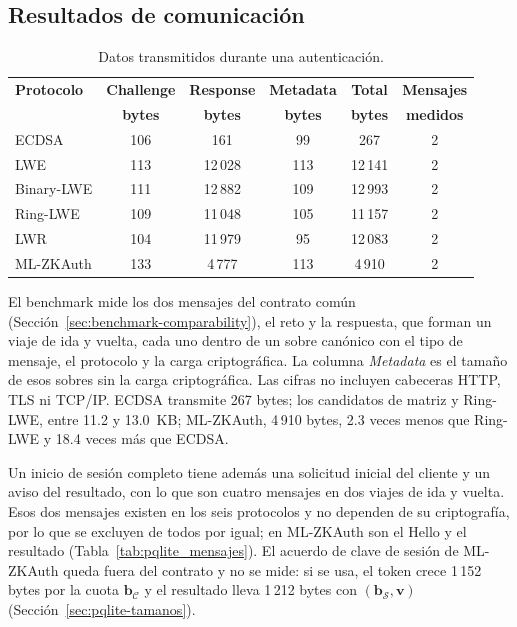\subsection{Resultados de comunicación}
\label{sec:communication-results}

\begin{table}[H]
\centering
\caption{Datos transmitidos durante una autenticación.}
\label{tab:communication}
\small
\begin{tabularx}{\textwidth}{lCCCCC}
\toprule
\textbf{Protocolo} &
\textbf{Challenge} &
\textbf{Response} &
\textbf{Metadata} &
\textbf{Total} &
\textbf{Mensajes} \\
&
\textbf{bytes} &
\textbf{bytes} &
\textbf{bytes} &
\textbf{bytes} &
\textbf{medidos} \\
\midrule

ECDSA      & 106 & 161 & 99 & 267 & 2 \\
LWE        & 113 & 12\,028 & 113 & 12\,141 & 2 \\
Binary-LWE & 111 & 12\,882 & 109 & 12\,993 & 2 \\
Ring-LWE   & 109 & 11\,048 & 105 & 11\,157 & 2 \\
LWR        & 104 & 11\,979 & 95 & 12\,083 & 2 \\
ML-ZKAuth  & 133 & 4\,777 & 113 & 4\,910 & 2 \\

\bottomrule
\end{tabularx}
\end{table}

El benchmark mide los dos mensajes del contrato común (Sección~\ref{sec:benchmark-comparability}), el reto y la respuesta, que forman un viaje de ida y vuelta, cada uno dentro de un sobre canónico con el tipo de mensaje, el protocolo y la carga criptográfica. La columna \textit{Metadata} es el tamaño de esos sobres sin la carga criptográfica. Las cifras no incluyen cabeceras HTTP, TLS ni TCP/IP. ECDSA transmite 267 bytes; los candidatos de matriz y Ring-LWE, entre 11.2 y 13.0~KB; ML-ZKAuth, 4\,910 bytes, 2.3 veces menos que Ring-LWE y 18.4 veces más que ECDSA.

Un inicio de sesión completo tiene además una solicitud inicial del cliente y un aviso del resultado, con lo que son cuatro mensajes en dos viajes de ida y vuelta. Esos dos mensajes existen en los seis protocolos y no dependen de su criptografía, por lo que se excluyen de todos por igual; en ML-ZKAuth son el \textsf{Hello} y el resultado (Tabla~\ref{tab:pqlite_mensajes}). El acuerdo de clave de sesión de ML-ZKAuth queda fuera del contrato y no se mide: si se usa, el token crece 1\,152 bytes por la cuota $\mathbf{b}_{\mathcal{C}}$ y el resultado lleva 1\,212 bytes con $(\mathbf{b}_{\mathcal{S}}, \mathbf{v})$ (Sección~\ref{sec:pqlite-tamanos}).

